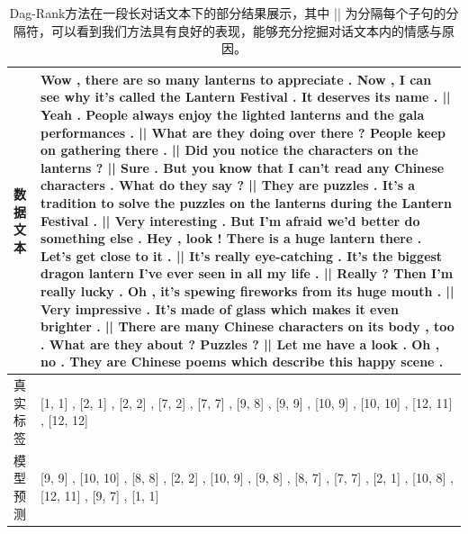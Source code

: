 \begin{table}[t]
	\renewcommand{\arraystretch}{1.2}
	\centering\wuhao
   \caption{Dag-Rank方法在一段长对话文本下的部分结果展示，其中 || 为分隔每个子句的分隔符，可以看到我们方法具有良好的表现，能够充分挖掘对话文本内的情感与原因。}
   \label{tab:display}
   \vspace{4mm}
   \begin{tabularx}{\textwidth}{m{2cm}p{12.8cm}}
   \toprule[1.5pt]
      
   \centering \textbf{数据文本}  & Wow , there are so many lanterns to appreciate . Now , I can see why it's called the Lantern Festival . It deserves its name . || Yeah . People always enjoy the lighted lanterns and the gala performances . || What are they doing over there ? People keep on gathering there . || Did you notice the characters on the lanterns ? || Sure . But you know that I can't read any Chinese characters . What do they say ? || They are puzzles . It's a tradition to solve the puzzles on the lanterns during the Lantern Festival . || Very interesting . But I'm afraid we'd better do something else . Hey , look ! There is a huge lantern there . Let's get close to it . || It's really eye-catching . It's the biggest dragon lantern I've ever seen in all my life . || Really ? Then I'm really lucky . Oh , it's spewing fireworks from its huge mouth . || Very impressive . It's made of glass which makes it even brighter . || There are many Chinese characters on its body , too . What are they about ? Puzzles ? || Let me have a look . Oh , no . They are Chinese poems which describe this happy scene .
   \\     \midrule[1pt]
   \centering 真实标签   &    [1, 1] , [2, 1] , [2, 2] , [7, 2] , [7, 7] , [9, 8] , [9, 9] , [10, 9] , [10, 10] , [12, 11] , [12, 12]   \\  
   \centering 模型预测   &    [9, 9] , [10, 10] , [8, 8] , [2, 2] , [10, 9] , [9, 8] , [8, 7] , [7, 7] , [2, 1] , [10, 8] , [12, 11] , [9, 7] , [1, 1]     \\     \bottomrule
   \end{tabularx}
   
    \vspace{8pt}

   \vspace{10pt}
\end{table}



